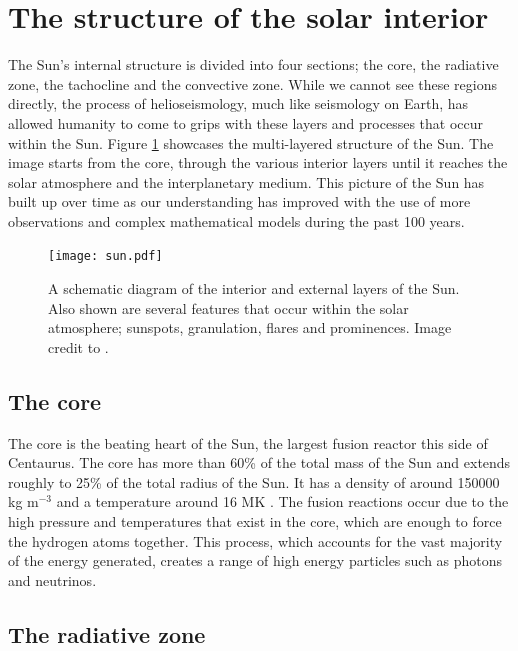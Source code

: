 \section{The structure of the solar interior}

    The Sun's internal structure is divided into four sections; the core, the radiative zone, the tachocline and the convective zone.
    While we cannot see these regions directly, the process of helioseismology, much like seismology on Earth, has allowed humanity to come to grips with these layers and processes that occur within the Sun.
    Figure \ref{fig:Sun} showcases the multi-layered structure of the Sun.
    The image starts from the core, through the various interior layers until it reaches the solar atmosphere and the interplanetary medium.
    This picture of the Sun has built up over time as our understanding has improved with the use of more observations and complex mathematical models during the past 100 years.
    
    \begin{figure}
        \centering
        \texttt{[image: sun.pdf]}
        \caption{
                A schematic diagram of the interior and external layers of the Sun.
                Also shown are several features that occur within the solar atmosphere; sunspots, granulation, flares and prominences.
                Image credit to \cite{sun_image}.
               }
        \label{fig:Sun}
    \end{figure}

\subsection{The core}

    The core is the beating heart of the Sun, the largest fusion reactor this side of Centaurus.
    The core has more than 60\% of the total mass of the Sun and extends roughly to 25\% of the total radius of the Sun.
    It has a density of around 150000 kg m$^{-3}$ and a temperature around 16 MK \citep{0004-637X-699-2-1403}.
    The fusion reactions occur due to the high pressure and temperatures that exist in the core, which are enough to force the hydrogen atoms together. 
    This process, which accounts for the vast majority of the energy generated, creates a range of high energy particles such as photons and neutrinos.
    
\subsection{The radiative zone}

